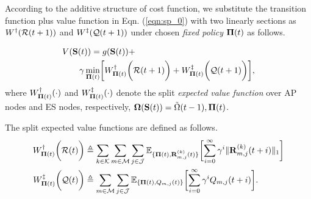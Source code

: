 According to the additive structure of cost function, we substitute the transition function plus value function in Eqn. (\ref{eqn:sp_0}) with two linearly sections as $W^{\dagger}(\mathcal{R}(t+1))$ and $W^{\ddagger}(\mathcal{Q}(t+1))$ under chosen \emph{fixed policy} $\boldsymbol{\Pi}(t)$ as follows.
\begin{definition}
    \begin{align}
        &V(\Stat(t)) = g(\Stat(t)) +
        \nonumber\\
        &~~~~~~\gamma \min_{\Baseline(t)} \Bracket{ W^{\AP}_{\Baseline(t)}\Paren{\mathcal{R}(t+1)} + W^{\ES}_{\Baseline(t)}\Paren{\mathcal{Q}(t+1)} },
    \end{align}
    where $W^{\dagger}_{\boldsymbol{\Pi}(t)}(\cdot)$ and $W^{\ddagger}_{\boldsymbol{\Pi}(t)}(\cdot)$ denote the split \emph{expected value function} over AP nodes and ES nodes, respectively, $\boldsymbol{\Omega}(\mathbf{S}(t)) = \tilde{\Omega}(t-1), \boldsymbol{\Pi}(t)$.

    The split expected value functions are defined as follows.
    \begin{align}
        W^{\AP}_{\Baseline(t)}\Paren{\mathcal{R}(t)}
            &\define \sum_{k\in\apSet}\sum_{m\in\esSet}\sum_{j\in\jSpace}
            \mathbb{E}_{\{\Baseline(t), \vec{R}^{(k)}_{m,j}(t)\}}\Bracket{
                \sum_{i=0}^{\infty} \gamma^{i} \Inorm{\vec{R}^{(k)}_{m,j}({t+i})}
            }
        \\
        W^{\ES}_{\Baseline(t)}\Paren{\mathcal{Q}(t)}
            &\define \sum_{m\in\esSet}\sum_{j\in\jSpace}
            \mathbb{E}_{\{\Baseline(t), Q_{m,j}(t)\}}\Bracket{
                \sum_{i=0}^{\infty} \gamma^{i} Q_{m,j}({t+i})
            }.
    \end{align}
\end{definition}


